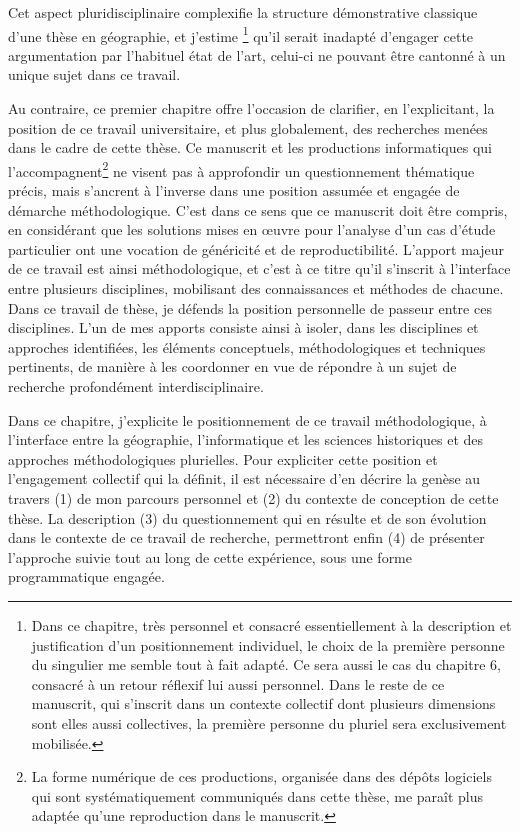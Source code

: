 Cet aspect pluridisciplinaire complexifie la structure démonstrative classique d'une thèse en géographie, et j'estime \footnote{
	Dans ce chapitre, très personnel et consacré essentiellement à la description et justification d'un positionnement individuel, le choix de la première personne du singulier me semble tout à fait adapté.
	Ce sera aussi le cas du chapitre 6, consacré à un retour réflexif lui aussi personnel.
	Dans le reste de ce manuscrit, qui s'inscrit dans un contexte collectif dont plusieurs dimensions sont elles aussi collectives, la première personne du pluriel sera exclusivement mobilisée.
} qu'il serait inadapté d'engager cette argumentation par l'habituel état de l'art, celui-ci ne pouvant être cantonné à un unique sujet dans ce travail.

Au contraire, ce premier chapitre offre l'occasion de clarifier, en l'explicitant, la position de ce travail universitaire, et plus globalement, des recherches menées dans le cadre de cette thèse.
Ce manuscrit et les productions informatiques qui l'accompagnent\footnote{
	La forme numérique de ces productions, organisée dans des dépôts logiciels qui sont systématiquement communiqués dans cette thèse, me paraît plus adaptée qu'une reproduction dans le manuscrit.
} ne visent pas à approfondir un questionnement thématique précis, mais s'ancrent à l'inverse dans une position assumée et engagée de démarche méthodologique.
C'est dans ce sens que ce manuscrit doit être compris, en considérant que les solutions mises en œuvre pour l'analyse d'un cas d'étude particulier ont une vocation de généricité et de reproductibilité.
L'apport majeur de ce travail est ainsi méthodologique, et c'est à ce titre qu'il s'inscrit à l'interface entre plusieurs disciplines, mobilisant des connaissances et méthodes de chacune.
Dans ce travail de thèse, je défends la position personnelle de passeur entre ces disciplines.
L'un de mes apports consiste ainsi à isoler, dans les disciplines  et approches identifiées, les éléments conceptuels, méthodologiques et techniques pertinents, de manière à les coordonner en vue de répondre à un sujet de recherche profondément interdisciplinaire.

Dans ce chapitre, j'explicite le positionnement de ce travail méthodologique, à l'interface entre la géographie, l'informatique et les sciences historiques et des approches méthodologiques plurielles.
Pour expliciter cette position et l'engagement collectif qui la définit, il est nécessaire d'en décrire la genèse au travers (1) de mon parcours personnel et (2) du contexte de conception de cette thèse.
La description (3) du questionnement qui en résulte et de son évolution dans le contexte de ce travail de recherche, permettront enfin (4) de présenter l'approche suivie tout au long de cette expérience, sous une forme programmatique engagée.


